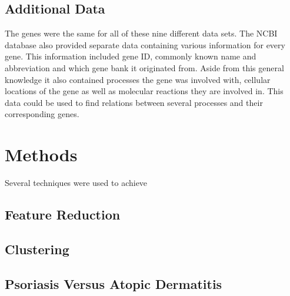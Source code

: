 \documentclass[10pt,a4paper]{article}
\begin{document}
	\subsection{Additional Data}
	\label{subsec:AdditionalData}
	
	The genes were the same for all of these nine different data sets. The NCBI database\cite{edgar2002gene} also provided separate data containing various information for every gene. This information included gene ID, commonly known name and abbreviation and which gene bank it originated from. Aside from this general knowledge it also contained processes the gene was involved with, cellular locations of the gene as well as molecular reactions they are involved in. This data could be used to find relations between several processes and their corresponding genes.
	
	\section{Methods}
	\label{sec:Methods}
	
	Several techniques were used to achieve 
	
	
	\subsection{Feature Reduction}
	\label{subsec:MethodsFeatureReduction}
	
	
	
	
	
	\subsection{Clustering}
	\label{subsec:MethodsPositionalClustering}
	
	
	
	
	\subsection{Psoriasis Versus Atopic Dermatitis}
	\label{subsec:MethodsPsoriasisVersusAtopicDermatitis}
	
\end{document}
